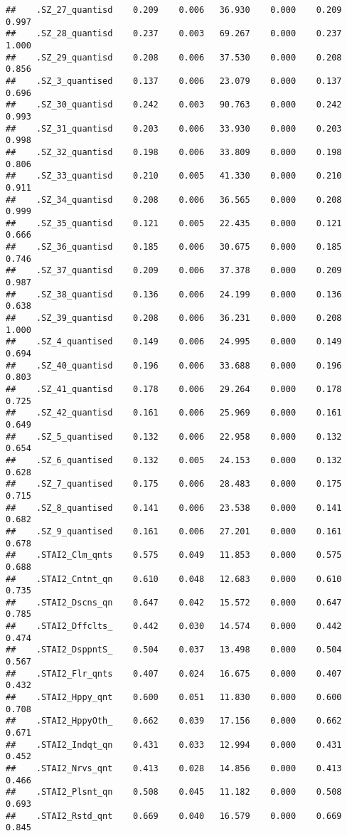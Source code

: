 \documentclass[]{article}
\begin{document}
\begin{verbatim}
##    .SZ_27_quantisd    0.209    0.006   36.930    0.000    0.209    0.997
##    .SZ_28_quantisd    0.237    0.003   69.267    0.000    0.237    1.000
##    .SZ_29_quantisd    0.208    0.006   37.530    0.000    0.208    0.856
##    .SZ_3_quantised    0.137    0.006   23.079    0.000    0.137    0.696
##    .SZ_30_quantisd    0.242    0.003   90.763    0.000    0.242    0.993
##    .SZ_31_quantisd    0.203    0.006   33.930    0.000    0.203    0.998
##    .SZ_32_quantisd    0.198    0.006   33.809    0.000    0.198    0.806
##    .SZ_33_quantisd    0.210    0.005   41.330    0.000    0.210    0.911
##    .SZ_34_quantisd    0.208    0.006   36.565    0.000    0.208    0.999
##    .SZ_35_quantisd    0.121    0.005   22.435    0.000    0.121    0.666
##    .SZ_36_quantisd    0.185    0.006   30.675    0.000    0.185    0.746
##    .SZ_37_quantisd    0.209    0.006   37.378    0.000    0.209    0.987
##    .SZ_38_quantisd    0.136    0.006   24.199    0.000    0.136    0.638
##    .SZ_39_quantisd    0.208    0.006   36.231    0.000    0.208    1.000
##    .SZ_4_quantised    0.149    0.006   24.995    0.000    0.149    0.694
##    .SZ_40_quantisd    0.196    0.006   33.688    0.000    0.196    0.803
##    .SZ_41_quantisd    0.178    0.006   29.264    0.000    0.178    0.725
##    .SZ_42_quantisd    0.161    0.006   25.969    0.000    0.161    0.649
##    .SZ_5_quantised    0.132    0.006   22.958    0.000    0.132    0.654
##    .SZ_6_quantised    0.132    0.005   24.153    0.000    0.132    0.628
##    .SZ_7_quantised    0.175    0.006   28.483    0.000    0.175    0.715
##    .SZ_8_quantised    0.141    0.006   23.538    0.000    0.141    0.682
##    .SZ_9_quantised    0.161    0.006   27.201    0.000    0.161    0.678
##    .STAI2_Clm_qnts    0.575    0.049   11.853    0.000    0.575    0.688
##    .STAI2_Cntnt_qn    0.610    0.048   12.683    0.000    0.610    0.735
##    .STAI2_Dscns_qn    0.647    0.042   15.572    0.000    0.647    0.785
##    .STAI2_Dffclts_    0.442    0.030   14.574    0.000    0.442    0.474
##    .STAI2_DsppntS_    0.504    0.037   13.498    0.000    0.504    0.567
##    .STAI2_Flr_qnts    0.407    0.024   16.675    0.000    0.407    0.432
##    .STAI2_Hppy_qnt    0.600    0.051   11.830    0.000    0.600    0.708
##    .STAI2_HppyOth_    0.662    0.039   17.156    0.000    0.662    0.671
##    .STAI2_Indqt_qn    0.431    0.033   12.994    0.000    0.431    0.452
##    .STAI2_Nrvs_qnt    0.413    0.028   14.856    0.000    0.413    0.466
##    .STAI2_Plsnt_qn    0.508    0.045   11.182    0.000    0.508    0.693
##    .STAI2_Rstd_qnt    0.669    0.040   16.579    0.000    0.669    0.845

\end{verbatim}
\end{document}

